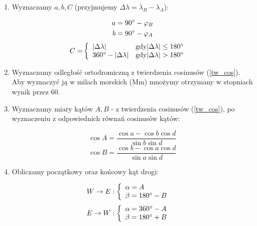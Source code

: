 \documentclass[10pt, twoside, fleqn]{article}
\begin{document}
\begin{enumerate}
				\item	Wyznaczamy $a,b,C$ (przyjmujemy 
						$\Delta \lambda = \lambda_B - \lambda_A$):
						\begin{multicols}{2}
						\noindent							
							\begin{align*}
									a & = 90\degree - \varphi_B \\
									b & = 90\degree - \varphi_A
							\end{align*}
							\begin{align*}
								C = & \left\{
  						\begin{array}{ll}
    							|\Delta \lambda|
    								& \mathrm{gdy}  |\Delta \lambda| \le 180\degree  \\
    							360\degree - |\Delta \lambda|
    								& \mathrm{gdy}  |\Delta \lambda| > 180\degree
  						\end{array} \right.
  							\end{align*}	
						\end{multicols}								
								
				\item	Wyznaczamy odległość ortodromiczną z twierdzenia cosinusów
						(\ref{tw_cos}).
						Aby wyznaczyć ją w milach morskich (Mm) mnożymy otrzymany w
						stopniach wynik przez $60$.
						
				\item	Wyznaczamy miary kątów $A,B$ - z twierdzenia cosinusów
						(\ref{tw_cos}),
						po wyznaczeniu z odpowiednich równań cosinusów kątów:
						\begin{multicols}{2}
						\noindent
						$$
							\cos{A} = 
								\frac{\cos{a}-\cos{b}\cos{d}}
									 {\sin{b}\sin{d}}
						$$
						$$ 
							\cos{B} = 
								\frac{\cos{b}-\cos{a}\cos{d}}
									 {\sin{a}\sin{d}}						
						$$
						\end{multicols}
			
				\item	Obliczamy początkowy oraz końcowy kąt drogi:


						\begin{multicols}{2}
						\noindent
							\begin{align*}	
								W \rightarrow E & : \left\{
  						\begin{array}{l}
    							\alpha = A				\\
    							\beta  = 180\degree - B \\
  						\end{array} \right.	
 							\end{align*}
 							\begin{align*}
								E \rightarrow W & : \left\{
  						\begin{array}{l}
    							\alpha = 360\degree - A	\\
    							\beta  = 180\degree + B \\
  						\end{array} \right.				
							\end{align*}						
						\end{multicols}
												

\end{enumerate}
\end{document}
